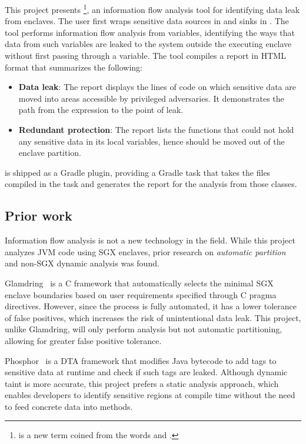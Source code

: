 This project presents \pname{}
\footnote{ is a new term coined from the words  and .},
an information flow analysis tool
for identifying data leak from enclaves.
The user first wraps sensitive data sources in  and sinks in .
The tool performs information flow analysis from  variables,
identifying the ways that data from such variables are leaked
to the system outside the executing enclave
without first passing through a  variable.
The tool compiles a report in HTML format that summarizes the following:
\begin{itemize}
	\item \textbf{Data leak}:
		The report displays the lines of code on which sensitive data are moved
		into areas accessible by privileged adversaries.
		It demonstrates the path from the  expression to the point of leak.
	\item \textbf{Redundant protection}:
		The report lists the functions that could not hold any sensitive data in its local variables,
		hence should be moved out of the enclave partition.
\end{itemize}

\pname{} is shipped as a Gradle plugin,
providing a Gradle task that
takes the  files compiled in the  task
and generates the report for the analysis from those classes.

\subsection{Prior work}\label{subsec:prior-art}
Information flow analysis is not a new technology in the field.
While this project analyzes \ac{JVM} code using \ac{SGX} enclaves,
prior research on \emph{automatic partition} and non-SGX dynamic analysis was found.

Glamdring~\cite{glamdring} is a C framework that
automatically selects the minimal \ac{SGX} enclave boundaries
based on user requirements specified through C pragma directives.
However, since the process is fully automated,
it has a lower tolerance of false positives,
which increases the risk of unintentional data leak.
This project, unlike Glamdring, will only perform analysis but not automatic partitioning,
allowing for greater false positive tolerance.

Phosphor~\cite{BellJonathan2014Pidd} is a \ac{DTA} framework
that modifies Java bytecode to add tags to sensitive data at runtime
and check if such tags are leaked.
Although dynamic taint is more accurate,
this project prefers a static analysis approach,
which enables developers to identify sensitive regions at compile time
without the need to feed concrete data into methods.

